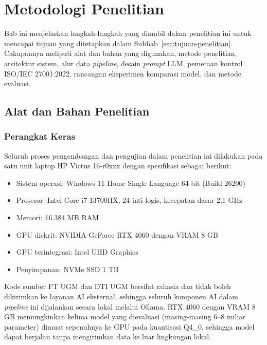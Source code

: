 \chapter{Metodologi Penelitian}

Bab ini menjelaskan langkah-langkah yang diambil dalam penelitian ini untuk mencapai tujuan yang ditetapkan dalam Subbab~\ref{sec:tujuan-penelitian}. Cakupannya meliputi alat dan bahan yang digunakan, metode penelitian, arsitektur sistem, alur data \textit{pipeline}, desain \textit{prompt} LLM, pemetaan kontrol ISO/IEC 27001:2022, rancangan eksperimen komparasi model, dan metode evaluasi.

\section{Alat dan Bahan Penelitian}

\subsection{Perangkat Keras}

Seluruh proses pengembangan dan pengujian dalam penelitian ini dilakukan pada satu unit laptop HP Victus 16-r0xxx dengan spesifikasi sebagai berikut:

\begin{itemize}

    \item Sistem operasi: Windows 11 Home Single Language 64-bit (Build 26200)

    \item Prosesor: Intel Core i7-13700HX, 24 inti logis, kecepatan dasar 2,1 GHz

    \item Memori: 16.384 MB RAM

    \item GPU diskrit: NVIDIA GeForce RTX 4060 dengan VRAM 8 GB

    \item GPU terintegrasi: Intel UHD Graphics

    \item Penyimpanan: NVMe SSD 1 TB

\end{itemize}
Kode sumber FT UGM dan DTI UGM bersifat rahasia dan tidak 
boleh dikirimkan ke layanan AI eksternal, sehingga seluruh 
komponen AI dalam \textit{pipeline} ini dijalankan secara 
lokal melalui Ollama. RTX 4060 dengan VRAM 8 GB memungkinkan 
kelima model yang dievaluasi (masing-masing 6--8 miliar 
parameter) dimuat sepenuhnya ke GPU pada kuantisasi Q4\_0, 
sehingga model dapat berjalan tanpa mengirimkan data ke 
luar lingkungan lokal.

